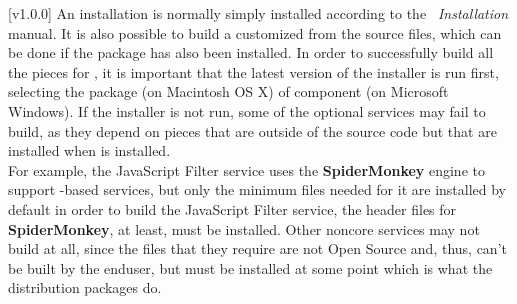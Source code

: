 [v1.0.0]
An \mplusm{} installation is normally simply installed according to the
\emph{\MMM{}~Installation} manual.
It is also possible to build a customized \mplusm{} from the source files, which can be
done if the  package has also been installed.
In order to successfully build all the pieces for \mplusm{}, it is important that the
latest version of the installer is run first, selecting the  package (on
Macintosh OS X) of  component (on Microsoft Windows).
If the installer is not run, some of the optional services may fail to build, as they
depend on pieces that are outside of the \mplusm{} source code but that are installed when
\mplusm{} is installed.\\

For example, the JavaScript Filter service uses the \textbf{SpiderMonkey} engine to
support -based services, but only the minimum files needed for it are
installed by default \longDash{} in order to build the JavaScript Filter service, the
header files for \textbf{SpiderMonkey}, at least, must be installed.
Other non\longDash{}core services may not build at all, since the files that they require
are not Open Source and, thus, can't be built by the end\longDash{}user, but must be
installed at some point \longDash{} which is what the distribution packages do.\\

